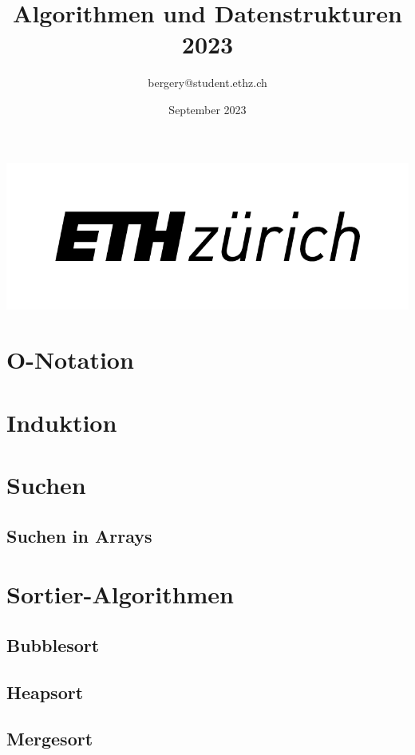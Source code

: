 \documentclass[a4paper]{article}
\title{Algorithmen und Datenstrukturen 2023}
\author{bergery@student.ethz.ch}
\date{September 2023}
\begin{document}
\maketitle
\begin{center}
    \includegraphics{eth_logo_kurz_pos Kopie.png}
\end{center}

\tableofcontents

\newpage

\section{O-Notation}

\section{Induktion}

\section{Suchen}

\subsection{Suchen in Arrays}

\section{Sortier-Algorithmen}

\subsection{Bubblesort}

\subsection{Heapsort}

\subsection{Mergesort}
\end{document}
